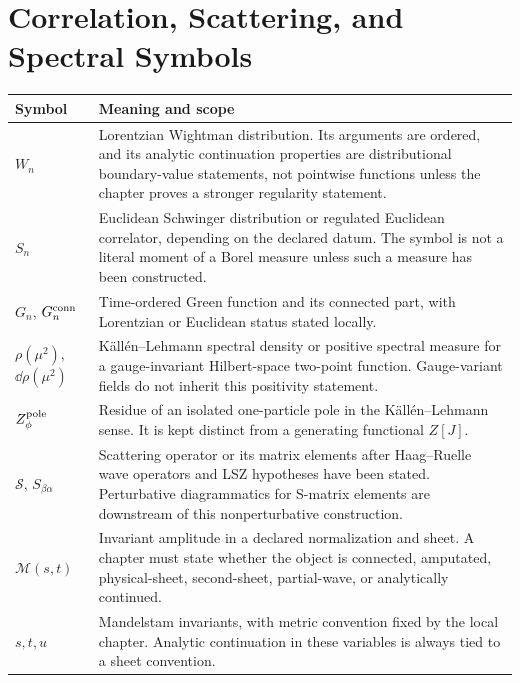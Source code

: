 \section*{Correlation, Scattering, and Spectral Symbols}

\begin{longtable}{>{\raggedright\arraybackslash}p{}
                  >{\raggedright\arraybackslash}p{}}
\hline
\textbf{Symbol} & \textbf{Meaning and scope}\\
\hline
\endhead
\(W_n\) &
Lorentzian Wightman distribution.  Its arguments are ordered, and its
analytic continuation properties are distributional boundary-value
statements, not pointwise functions unless the chapter proves a stronger
regularity statement.\\
\(S_n\) &
Euclidean Schwinger distribution or regulated Euclidean correlator, depending
on the declared datum.  The symbol is not a literal moment of a Borel measure
unless such a measure has been constructed.\\
\(G_n\), \(G_n^{\rm conn}\) &
Time-ordered Green function and its connected part, with Lorentzian or
Euclidean status stated locally.\\
\(\rho(\mu^2)\), \(\dd\rho(\mu^2)\) &
K\"all\'en--Lehmann spectral density or positive spectral measure for a
gauge-invariant Hilbert-space two-point function.  Gauge-variant fields do
not inherit this positivity statement.\\
\(Z_\phi^{\rm pole}\) &
Residue of an isolated one-particle pole in the K\"all\'en--Lehmann sense.  It is
kept distinct from a generating functional \(Z[J]\).\\
\(\mathcal S\), \(S_{\beta\alpha}\) &
Scattering operator or its matrix elements after Haag--Ruelle wave operators
and LSZ hypotheses have been stated.  Perturbative diagrammatics for
S-matrix elements are downstream of this nonperturbative construction.\\
\(\mathcal M(s,t)\) &
Invariant amplitude in a declared normalization and sheet.  A chapter must
state whether the object is connected, amputated, physical-sheet,
second-sheet, partial-wave, or analytically continued.\\
\(s,t,u\) &
Mandelstam invariants, with metric convention fixed by the local chapter.
Analytic continuation in these variables is always tied to a sheet
convention.\\
\hline
\end{longtable}

